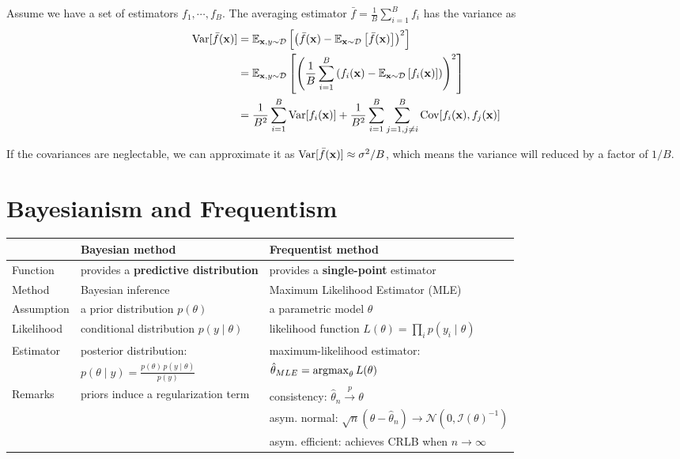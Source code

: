 \begin{property}
	Assume we have a set of estimators $f_1, \cdots, f_B$. The averaging estimator $\bar{f} = \frac{1}{B} \sum_{i=1}^B f_i$ has the variance as
	\begin{align}
	\mathrm{Var}[\bar{f}(\mathbf{x})] & = \mathbb{E}_{\mathbf{x}, y \sim \mathcal{D}}\left[ \left(\bar{f}(\mathbf{x}) - \mathbb{E}_{\mathbf{x} \sim \mathcal{D}}\left[ \bar{f}(\mathbf{x}) \right]\right)^2 \right] \\
	& =  \mathbb{E}_{\mathbf{x}, y \sim \mathcal{D}}\left[ \left(\frac{1}{B} \sum_{i=1}^B \left({f_i}(\mathbf{x}) - \mathbb{E}_{\mathbf{x} \sim \mathcal{D}}\left[ {f_i}(\mathbf{x}) \right]\right)\right)^2 \right] \\
	& = \frac{1}{B^2} \sum_{i=1}^B \mathrm{Var}[{f_i}(\mathbf{x})] + \frac{1}{B^2} \sum_{i=1}^B \sum_{j=1, j\neq i}^B \mathrm{Cov}[{f_i}(\mathbf{x}), {f_j}(\mathbf{x})]
	\end{align} 
\end{property}
\remark If the covariances are neglectable, we can approximate it as $\mathrm{Var}[\bar{f}(\mathbf{x})] \approx \sigma^2 / B $, which means the variance will reduced by a factor of $1/B$.
  
\section{Bayesianism and Frequentism}
\begin{table}[h]
\center
\begin{adjustbox}{width=1\textwidth}
\begin{tabular}{l l l}
		\toprule
		 & \textbf{Bayesian method} & \textbf{Frequentist method} \\
		 \midrule
		 Function & provides a \textbf{predictive distribution} & provides a \textbf{single-point} estimator \\
		 Method & Bayesian inference & Maximum Likelihood Estimator (MLE) \\ \midrule
		 Assumption & a prior distribution $p(\theta)$  & a parametric model $\theta$ \\
		 Likelihood &  conditional distribution $p(y \mid \theta)$ & likelihood function $L(\theta) = \prod_i p(y_i \mid \theta)$ \\
		 Estimator & posterior distribution: & maximum-likelihood estimator:  \\
		 & $\displaystyle p(\theta \mid y) = \frac{p(\theta)\, p(y\mid \theta)}{p(y)}$ & $\hat{\theta}_{MLE} = \operatorname*{argmax}_\theta L(\theta)$ \\ \midrule
		 Remarks & priors induce a regularization term & consistency: $\hat{\theta}_{n} \overset{p}{\longrightarrow} \theta $  \\
		 & & asym. normal: $\sqrt{n} (\theta - \hat{\theta}_n) \longrightarrow \mathcal{N}(0, \mathcal{I}(\theta)^{-1}) $ \\
		 & & asym. efficient: achieves CRLB when $n \rightarrow \infty$\\
		\toprule
	\end{tabular}
\end{adjustbox}
\end{table}


